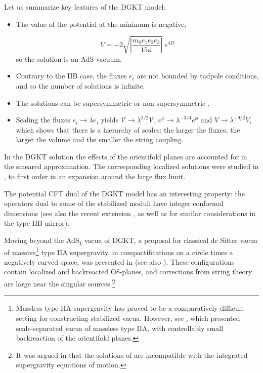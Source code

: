 \documentclass[12pt,a4wide]{article}
\def\V{\mathcal{V}}
\def\be{\begin{equation}}
\def\ee{\end{equation}}
\begin{document}
Let us summarize key features of the DGKT model:
\begin{itemize}
    \item The value of the potential at the minimum is negative,
   
    \be
V=- 2 \sqrt{\left| \frac{ m_0 e_1 e_2 e_3}{15 \kappa } \right|}~ e^{4D}
    \ee
    so the solution is an AdS vacuum.
    \item Contrary to the IIB case, the fluxes $e_i$ are not bounded by tadpole conditions, and so the number of solutions is infinite.
    \item The solutions can be supersymmetric or non-supersymmetric \cite{DeWolfe:2005uu,Marchesano:2019hfb}. 
    \item Scaling the fluxes $e_i\rightarrow \lambda e_i$ yields $\V\rightarrow \lambda^{3/2}\V$, $e^\phi \rightarrow \lambda^{-3/4} e^\phi$ and $V\rightarrow \lambda^{-9/2}V$, which shows that there is a hierarchy of scales: the larger the fluxes, the larger the volume and the smaller the string coupling.
\end{itemize}
In the DGKT solution the effects of the orientifold planes are accounted for in the smeared approximation.
The corresponding localized solutions were studied in  \cite{Junghans:2020acz,Marchesano:2020qvg}, to first order in an expansion around the large flux limit.

The potential CFT dual of the DGKT model has an interesting property: the operators dual to some of the stabilized moduli have integer conformal dimensions \cite{Apers:2022tfm,Apers:2022zjx,Apers:2022vfp,Quirant:2022fpn} 
(see also the recent extension \cite{Andriot:2023fss}, as well as \cite{Plauschinn:2022ztd} for similar considerations in the type IIB mirror).
  

Moving beyond the AdS$_4$ vacua of DGKT, 
a proposal for classical de Sitter vacua of 
massive\footnote{Massless type IIA supergravity has proved to be a comparatively difficult setting for constructing stabilized vacua.  However, see \cite{Cribiori:2021djm}, which presented scale-separated vacua of massless type IIA, with controllably small backreaction of the orientifold planes.} type IIA supergravity, in compactifications on a circle times a negatively curved space, was presented in \cite{Cordova:2018dbb} (see also \cite{Cordova:2019cvf}).  These configurations contain localized and backreacted O8-planes, and corrections from string theory are large near the singular sources.\footnote{It was argued in
\cite{Cribiori:2019clo} that the solutions of \cite{Cordova:2018dbb} are incompatible with the
integrated supergravity equations of motion.}
\end{document}

